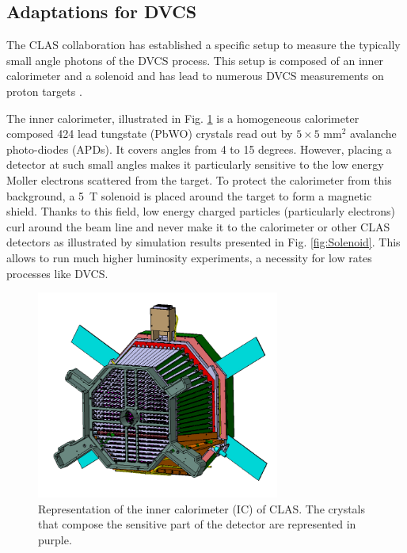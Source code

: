 \documentclass[aps,prc,preprint,superscriptaddress]{revtex4}
\begin{document}
\subsection{Adaptations for DVCS}

The CLAS collaboration has established a specific setup to measure the typically 
small angle photons of the DVCS process. This setup is composed of an inner 
calorimeter and a solenoid and has lead to numerous DVCS measurements on proton 
targets \cite{Seder:2014cdc,Jo:2015ema,HirlingerSaylor:2018bnu}.

The inner calorimeter, illustrated in Fig. \ref{fig:IC} is a homogeneous 
calorimeter composed 424 lead tungstate 
(PbWO) crystals read out by $5 \times 5$ mm$^2$ avalanche photo-diodes (APDs). 
It covers angles from 4 to 15 degrees. However, placing a detector at such small angles makes it 
particularly sensitive to the low energy Moller electrons scattered from the target.
To protect the calorimeter from this background, a 5~T solenoid is 
placed around the target to form
a magnetic shield. Thanks to this field, low energy charged particles (particularly 
electrons) curl around the beam line 
and never make it to the calorimeter or other CLAS detectors as illustrated 
by simulation results presented 
in Fig. \ref{fig:Solenoid}. This allows to run much higher luminosity experiments,
a necessity for low rates processes like DVCS.

\begin{figure}[tbp!]
\center
\includegraphics[width=8cm]{fig3/IC-CLAS.png}
	\caption{Representation of the inner calorimeter (IC) of CLAS. The crystals that compose the
	sensitive part of the detector are represented in purple.}
\label{fig:IC}
\end{figure}
\end{document}
